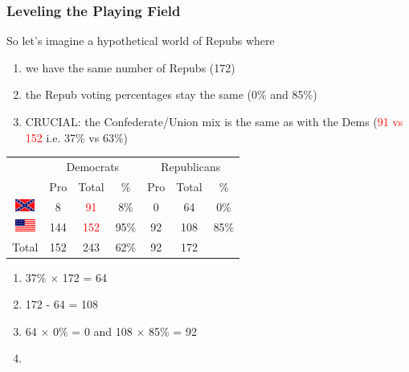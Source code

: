 \documentclass[slides]{beamer}\usepackage[]{graphicx}\usepackage[]{color}
\newcommand{\blue}[1]{\textcolor{blue2}{#1}}
\begin{document}
\begin{frame}
\frametitle{Leveling the Playing Field}
\begin{small}
So let's imagine a hypothetical world of Repubs where
\begin{enumerate}
\item we have the same number of Repubs (172)
\item the Repub voting percentages stay the same (0\% and 85\%)
\item CRUCIAL: the Confederate/Union mix is the same as with the Dems (\textcolor{red}{91 vs 152} i.e. 37\% vs 63\%) 
\end{enumerate}
\end{small}


\begin{center}
	\begin{tabular}{c|ccc|ccc}
     & \multicolumn{3}{c|}{Democrats}  & \multicolumn{3}{c}{Republicans} \\ 
     & Pro & Total & \% & Pro & Total & \% \\ 
     \hline
     \includegraphics[height=0.4cm]{conf} & 8 & \textcolor{red}{91} & 8\% & 0 & 64 & 0\% \\ 
	 \includegraphics[height=0.4cm]{union} & 144 & \textcolor{red}{152} & 95\% & 92 & 108 & 85\% \\ 
    \hline
     Total & 152 & 243 & 62\% & 92 & 172 & \blue{} \\ 
  \end{tabular}
\end{center}

\begin{enumerate}
\item 37\% $\times$ 172 = 64
\item 172 - 64 = 108
\item 64 $\times$ 0\% = 0 and 108 $\times$ 85\% = 92
\item[] \textcolor{white}{92/(92+172) = 53\%}
\end{enumerate}

\end{frame}
\end{document}
